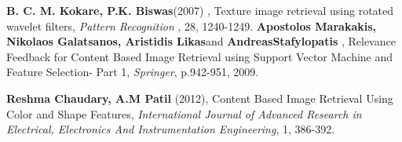 \begin{thebibliography}{50}
\textbf{ B. C. M. Kokare,  P.K. Biswas}(2007) , Texture image retrieval  using rotated wavelet  filters,  \textit{Pattern Recognition} ,  28,  1240-1249.
\textbf{ Apostolos Marakakis, Nikolaos Galatsanos, Aristidis Likas}and\textbf{ AndreasStafylopatis }, Relevance Feedback for Content Based Image Retrieval using Support Vector Machine and Feature Selection- Part 1, \textit{Springer}, p.942-951, 2009.

\textbf{Reshma Chaudary, A.M Patil }(2012),  Content Based Image Retrieval Using Color and Shape Features,\textit{ International Journal of Advanced Research in Electrical, Electronics And Instrumentation Engineering}, 1, 386-392.


\end{thebibliography}




